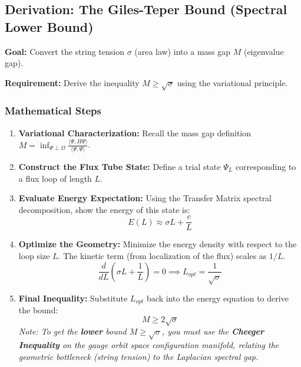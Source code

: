 \subsection{Derivation: The Giles-Teper Bound (Spectral Lower Bound)}

\textbf{Goal:} Convert the string tension $\sigma$ (area law) into a mass gap $M$ (eigenvalue gap).

\textbf{Requirement:} Derive the inequality $M \ge \sqrt{\sigma}$ using the variational principle.

\subsubsection*{Mathematical Steps}

\begin{enumerate}
    \item \textbf{Variational Characterization:}
    Recall the mass gap definition $M = \inf_{\Psi \perp \Omega} \frac{\langle \Psi, H \Psi \rangle}{\langle \Psi, \Psi \rangle}$.

    \item \textbf{Construct the Flux Tube State:}
    Define a trial state $\Psi_L$ corresponding to a flux loop of length $L$.

    \item \textbf{Evaluate Energy Expectation:}
    Using the Transfer Matrix spectral decomposition, show the energy of this state is:
    \begin{equation}
        E(L) \approx \sigma L + \frac{c}{L}
    \end{equation}

    \item \textbf{Optimize the Geometry:}
    Minimize the energy density with respect to the loop size $L$. The kinetic term (from localization of the flux) scales as $1/L$.
    \begin{equation}
        \frac{d}{dL} \left( \sigma L + \frac{1}{L} \right) = 0 \implies L_{opt} = \frac{1}{\sqrt{\sigma}}
    \end{equation}

    \item \textbf{Final Inequality:}
    Substitute $L_{opt}$ back into the energy equation to derive the bound:
    \begin{equation}
        M \ge 2\sqrt{\sigma}
    \end{equation}
    \textit{Note: To get the \textbf{lower} bound $M \ge \sqrt{\sigma}$, you must use the \textbf{Cheeger Inequality} on the gauge orbit space configuration manifold, relating the geometric bottleneck (string tension) to the Laplacian spectral gap.}
\end{enumerate}



